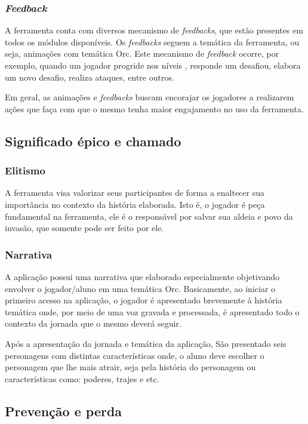 \subsubsection{\textit{Feedback}}

A ferramenta conta com diversos mecanismo de \textit{feedbacks}, que estão presentes em todos os módulos disponíveis.
Os \textit{feedbacks} seguem a temática da ferramenta, ou seja, animações com temática Orc. Este mecanismo de \textit{feedback} ocorre, por exemplo, quando um jogador progride nos níveis
, responde um desafiou, elabora um novo desafio, realiza ataques, entre outros.

Em geral, as animações e \textit{feedbacks} buscam encorajar os jogadores a realizarem ações que faça com que o mesmo tenha maior engajamento no uso
da ferramenta.

\subsection{Significado épico e chamado}
\subsubsection{Elitismo}
A ferramenta visa valorizar seus participantes de forma a enaltecer sua importância no contexto da história 
elaborada. Isto é, o jogador é peça fundamental na ferramenta, ele é o responsável por salvar sua aldeia e povo
da invasão, que somente pode ser feito por ele.


\subsubsection{Narrativa}
A aplicação possui uma narrativa que elaborado especialmente objetivando envolver o jogador/aluno
em uma temática Orc. Basicamente, ao iniciar o primeiro acesso na aplicação, o jogador é apresentado brevemente à história temática onde,
por meio de uma voz gravada e processada, é apresentado todo o contexto da jornada que o mesmo deverá seguir.

Após a apresentação da jornada e temática da aplicação, São presentado seis personagens com distintas características onde, o aluno deve escolher o personagem
que lhe mais atrair, seja pela história do personagem ou características como: poderes, trajes e etc.

\subsection{Prevenção e perda}
